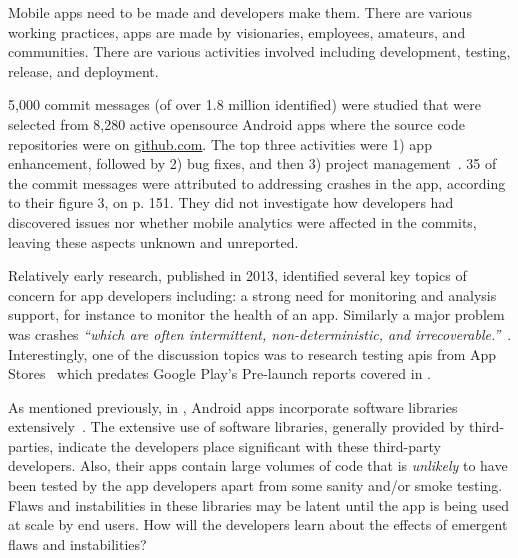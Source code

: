 
Mobile apps need to be made and developers make them. There are various working practices, apps are made by visionaries, employees, amateurs, and communities. There are various activities involved including development, testing, release, and deployment. %


5,000 commit messages (of over 1.8 million identified) were studied that were selected from 8,280 active opensource Android apps where the source code repositories were on \href{https://github.com/}{github.com}. The top three activities were 1) app enhancement, followed by 2) bug fixes, and then 3) project management~. 35 of the commit messages were attributed to addressing crashes in the app, according to their figure 3, on p. 151. They did not investigate how developers had discovered issues nor whether mobile analytics were affected in the commits, leaving these aspects unknown and unreported.

Relatively early research, published in 2013, identified several key topics of concern for app developers including: a strong need for monitoring and analysis support, for instance to monitor the health of an app. Similarly a major problem was crashes \emph{``which are often intermittent, non-deterministic, and irrecoverable.''}~. Interestingly, one of the discussion topics was to research testing \acrshort{api}s from App Stores~ which predates Google Play's Pre-launch reports covered in .


As mentioned previously, in , Android apps incorporate software libraries extensively~. The extensive use of software libraries, generally provided by third-parties, indicate the developers place significant  with these third-party developers. Also, their apps contain large volumes of code that is \emph{unlikely} to have been tested by the app developers apart from some sanity and/or smoke testing. Flaws and instabilities in these libraries may be latent until the app is being used at scale by end users. How will the developers learn about the effects of emergent flaws and instabilities?


